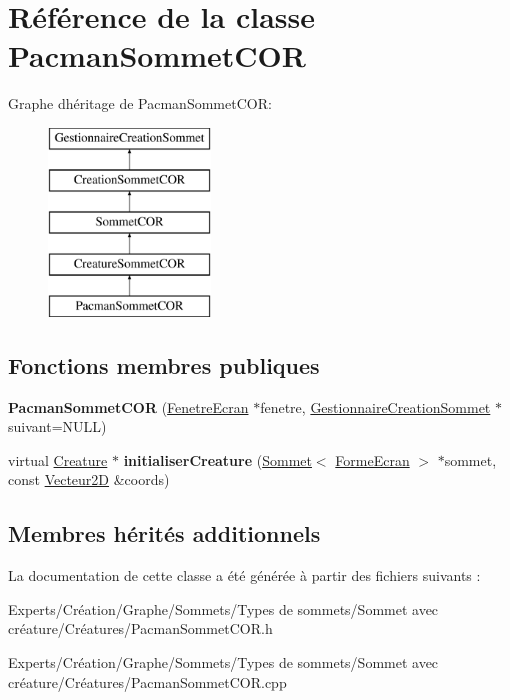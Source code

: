 \hypertarget{class_pacman_sommet_c_o_r}{}\section{Référence de la classe Pacman\+Sommet\+C\+OR}
\label{class_pacman_sommet_c_o_r}
Graphe d\textquotesingle{}héritage de Pacman\+Sommet\+C\+OR\+:\begin{figure}[H]
\begin{center}
\leavevmode
\includegraphics[height=5.000000cm]{class_pacman_sommet_c_o_r}
\end{center}
\end{figure}
\subsection*{Fonctions membres publiques}
\begin{DoxyCompactItemize}
\item 
\mbox{\label{class_pacman_sommet_c_o_r_a80da4eda68ed86b8a9b384a32d85dfa7}} 
{\bfseries Pacman\+Sommet\+C\+OR} (\mbox{\hyperlink{class_fenetre_ecran}{Fenetre\+Ecran}} $\ast$fenetre, \mbox{\hyperlink{class_gestionnaire_creation_sommet}{Gestionnaire\+Creation\+Sommet}} $\ast$suivant=N\+U\+LL)
\item 
\mbox{\label{class_pacman_sommet_c_o_r_a6a8b7602639f7e47f958b0505bf2c5a4}} 
virtual \mbox{\hyperlink{class_creature}{Creature}} $\ast$ {\bfseries initialiser\+Creature} (\mbox{\hyperlink{class_sommet}{Sommet}}$<$ \mbox{\hyperlink{class_forme_ecran}{Forme\+Ecran}} $>$ $\ast$sommet, const \mbox{\hyperlink{class_vecteur2_d}{Vecteur2D}} \&coords)
\end{DoxyCompactItemize}
\subsection*{Membres hérités additionnels}


La documentation de cette classe a été générée à partir des fichiers suivants \+:\begin{DoxyCompactItemize}
\item 
Experts/\+Création/\+Graphe/\+Sommets/\+Types de sommets/\+Sommet avec créature/\+Créatures/Pacman\+Sommet\+C\+O\+R.\+h\item 
Experts/\+Création/\+Graphe/\+Sommets/\+Types de sommets/\+Sommet avec créature/\+Créatures/Pacman\+Sommet\+C\+O\+R.\+cpp\end{DoxyCompactItemize}
